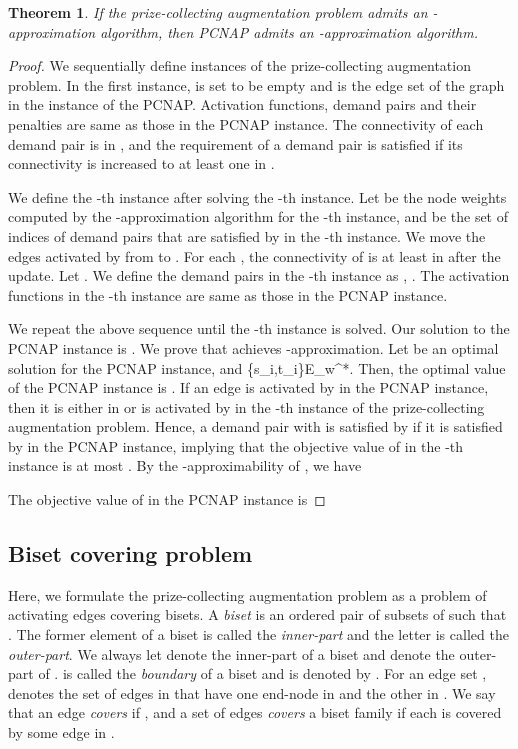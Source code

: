 \documentclass[11pt]{article}
\newtheorem{theorem}{Theorem}
\begin{document}
\begin{theorem}\label{thm.augmentation}
 If the prize-collecting augmentation problem admits an
 -approximation algorithm, then PCNAP admits an -approximation algorithm.
\end{theorem}
\begin{proof}
 We sequentially define instances of the prize-collecting augmentation
 problem. In the first instance,
  is set to be empty and  is the edge set of the graph in the
 instance of the PCNAP. 
 Activation functions, demand pairs and their penalties are same as
 those in the PCNAP instance.
 The connectivity of each demand pair is  in ,
 and the requirement of a demand pair is satisfied 
 if its connectivity is increased to at least one in .
 
 We define the -th instance after solving the -th instance.
 Let  be the node weights computed by the
 -approximation algorithm for the -th instance,
 and  be the set of indices of demand pairs that are
 satisfied by  in the -th instance.
 We move the edges activated by  from  to .
 For each , the connectivity of   is at least
  in  after the update.
 Let .
 We define the demand pairs in the -th instance as ,
 .
 The activation functions in the -th instance 
 are same as those in the PCNAP instance.

 We repeat the above sequence until the -th instance is solved.
 Our solution to the PCNAP instance is .
 We prove that  achieves -approximation.
 Let  be an optimal solution for the PCNAP instance, and \{s_i,t_i\}E_{w^*}.
 Then,
 the optimal value of the PCNAP instance is 
 .
 If an edge is activated by  in the PCNAP instance,
 then it is either in  or is activated by  in the -th
 instance of the prize-collecting augmentation problem.
 Hence, a demand pair  with 
 is satisfied by  if it is satisfied by  in the PCNAP instance,
 implying that
 the objective value of  
 in the -th instance
 is at most .
 By the -approximability of ,
 we have

The objective value of  in the PCNAP instance is 

\end{proof}


\subsection{Biset covering problem}\label{sec.biset}
Here, we formulate the prize-collecting augmentation problem 
as a problem of activating edges covering bisets.
A {\em biset} is an ordered pair  of subsets of  such that . The former element of a biset is called the {\em inner-part} and the
letter is called the {\em outer-part}. 
We always let  denote the inner-part of
a biset  and  denote the outer-part of .
 is called the {\em boundary} of a biset  and is denoted
by .
For an edge set ,  denotes the set of edges in
 that have one end-node in  and the other in .
We say that an edge  {\em covers}  if 
, and a set  of edges {\em covers} 
a biset family  if each  is covered by some
edge in .
\end{document}
